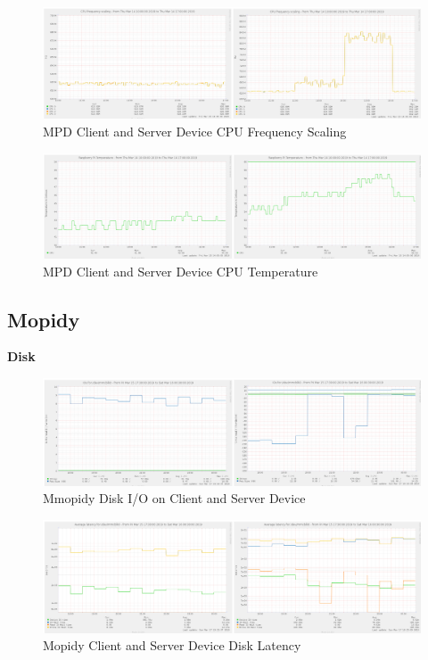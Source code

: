 \documentclass[11pt,a4paper,headinclude=false,footinclude=false]{scrreprt}
\begin{document}
\begin{figure}[H]
\includegraphics{ResultsAndAnalysis/MPDServerTestImages/002MPDCPUFreqScaling.png}
\centering
\caption{MPD Client and Server Device CPU Frequency Scaling}
\label{MPDCPUFreqScaling}
\end{figure}

\begin{figure}[H]
\includegraphics{ResultsAndAnalysis/MPDServerTestImages/003MPDCPUTemp.png}
\centering
\caption{MPD Client and Server Device CPU Temperature}
\label{MPDCPUTemp}
\end{figure}

\subsection{Mopidy}\label{mopidy-2}

\textbf{Disk}

\begin{figure}[H]
\includegraphics{ResultsAndAnalysis/MopidyServerTestImages/005MopidyDiskIO.png}
\centering
\caption{Mmopidy Disk I/O on Client and Server Device}
\label{MopidyDiskIO}
\end{figure}

\begin{figure}[H]
\includegraphics{ResultsAndAnalysis/MopidyServerTestImages/006MopidyDiskLatency.png}
\centering
\caption{Mopidy Client and Server Device Disk Latency}
\label{MopidyDiskLatency}
\end{figure}
\end{document}
